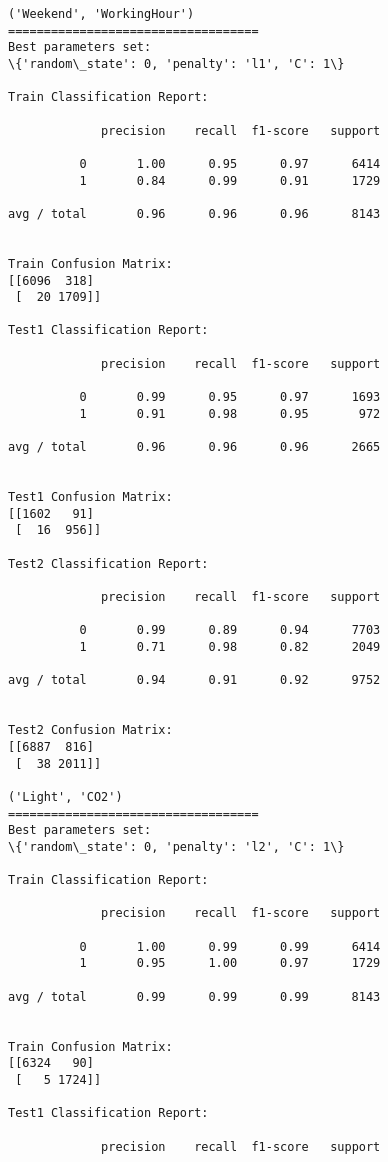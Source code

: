 \documentclass[11pt]{article}
\begin{document}
    \begin{Verbatim}[commandchars=\\\{\}]
('Weekend', 'WorkingHour')
===================================
Best parameters set:
\{'random\_state': 0, 'penalty': 'l1', 'C': 1\}

Train Classification Report:

             precision    recall  f1-score   support

          0       1.00      0.95      0.97      6414
          1       0.84      0.99      0.91      1729

avg / total       0.96      0.96      0.96      8143


Train Confusion Matrix:
[[6096  318]
 [  20 1709]]

Test1 Classification Report:

             precision    recall  f1-score   support

          0       0.99      0.95      0.97      1693
          1       0.91      0.98      0.95       972

avg / total       0.96      0.96      0.96      2665


Test1 Confusion Matrix:
[[1602   91]
 [  16  956]]

Test2 Classification Report:

             precision    recall  f1-score   support

          0       0.99      0.89      0.94      7703
          1       0.71      0.98      0.82      2049

avg / total       0.94      0.91      0.92      9752


Test2 Confusion Matrix:
[[6887  816]
 [  38 2011]]

('Light', 'CO2')
===================================
Best parameters set:
\{'random\_state': 0, 'penalty': 'l2', 'C': 1\}

Train Classification Report:

             precision    recall  f1-score   support

          0       1.00      0.99      0.99      6414
          1       0.95      1.00      0.97      1729

avg / total       0.99      0.99      0.99      8143


Train Confusion Matrix:
[[6324   90]
 [   5 1724]]

Test1 Classification Report:

             precision    recall  f1-score   support


\end{Verbatim}
\end{document}
